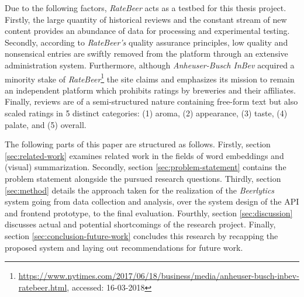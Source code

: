 Due to the following factors, \textit{RateBeer} acts as a testbed for this thesis project.
Firstly, the large quantity of historical reviews and the constant stream of new content provides an abundance of data for processing and experimental testing.
Secondly, according to \textit{RateBeer's} quality assurance principles, low quality and nonsensical entries are swiftly removed from the platform through an extensive administration system.
Furthermore, although \textit{Anheuser-Busch InBev} acquired a minority stake of \textit{RateBeer}\footnote{\url{https://www.nytimes.com/2017/06/18/business/media/anheuser-busch-inbev-ratebeer.html}, accessed: 16-03-2018} the site claims and emphasizes its mission to remain an independent platform which prohibits ratings by breweries and their affiliates.
Finally, reviews are of a semi-structured nature containing free-form text but also scaled ratings in 5 distinct categories: (1) aroma, (2) appearance, (3) taste, (4) palate, and (5) overall.

The following parts of this paper are structured as follows.
Firstly, section \ref{sec:related-work} examines related work in the fields of word embeddings and (visual) summarization.
Secondly, section \ref{sec:problem-statement} contains the problem statement alongside the pursued research questions.
Thirdly, section \ref{sec:method} details the approach taken for the realization of the \textit{Beerlytics} system going from data collection and analysis, over the system design of the API and frontend prototype, to the final evaluation.
Fourthly, section \ref{sec:discussion} discusses actual and potential shortcomings of the research project.
Finally, section \ref{sec:conclusion-future-work} concludes this research by recapping the proposed system and laying out recommendations for future work.